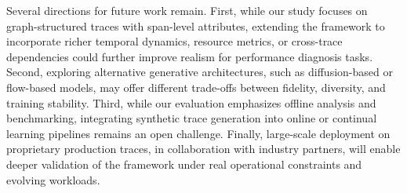 \documentclass[sigconf,review]{acmart}
\begin{document}
Several directions for future work remain. First, while our study focuses on graph-structured traces with span-level attributes, extending the framework to incorporate richer temporal dynamics, resource metrics, or cross-trace dependencies could further improve realism for performance diagnosis tasks. Second, exploring alternative generative architectures, such as diffusion-based or flow-based models, may offer different trade-offs between fidelity, diversity, and training stability. Third, while our evaluation emphasizes offline analysis and benchmarking, integrating synthetic trace generation into online or continual learning pipelines remains an open challenge. Finally, large-scale deployment on proprietary production traces, in collaboration with industry partners, will enable deeper validation of the framework under real operational constraints and evolving workloads.


% 
% 

% 

\end{document}
